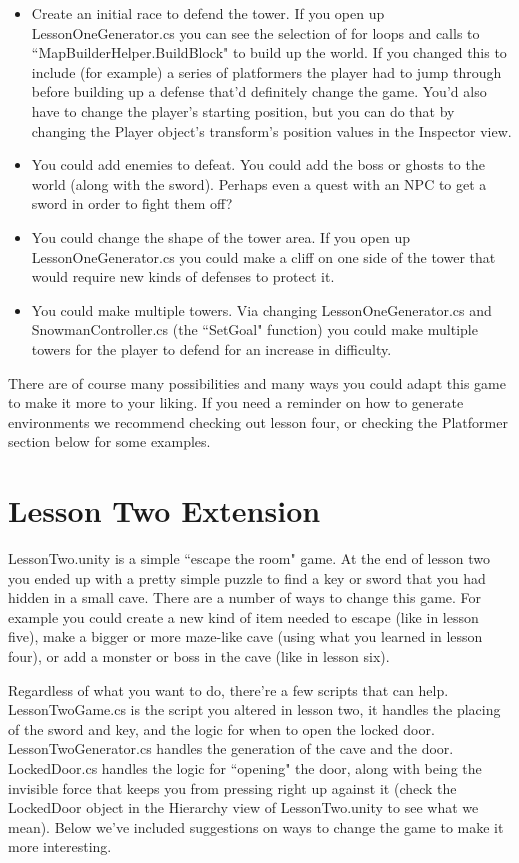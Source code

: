 \documentclass{article}
\begin{document}
\begin{itemize}
  \item Create an initial race to defend the tower. If you open up LessonOneGenerator.cs you can see the selection of for loops and calls to ``MapBuilderHelper.BuildBlock" to build up the world. If you changed this to include (for example) a series of platformers the player had to jump through before building up a defense that'd definitely change the game. You'd also have to change the player's starting position, but you can do that by changing the Player object's transform's position values in the Inspector view. 
  \item You could add enemies to defeat. You could add the boss or ghosts to the world (along with the sword). Perhaps even a quest with an NPC to get a sword in order to fight them off? 
  \item You could change the shape of the tower area. If you open up LessonOneGenerator.cs you could make a cliff on one side of the tower that would require new kinds of defenses to protect it.
  \item You could make multiple towers. Via changing LessonOneGenerator.cs and SnowmanController.cs (the ``SetGoal" function) you could make multiple towers for the player to defend for an increase in difficulty.
\end{itemize}

There are of course many possibilities and many ways you could adapt this game to make it more to your liking. If you need a reminder on how to generate environments we recommend checking out lesson four, or checking the Platformer section below for some examples.

\section{Lesson Two Extension}

LessonTwo.unity is a simple ``escape the room" game. At the end of lesson two you ended up with a pretty simple puzzle to find a key or sword that you had hidden in a small cave. There are a number of ways to change this game. For example you could create a new kind of item needed to escape (like in lesson five), make a bigger or more maze-like cave (using what you learned in lesson four), or add a monster or boss in the cave (like in lesson six). 

Regardless of what you want to do, there're a few scripts that can help. LessonTwoGame.cs is the script you altered in lesson two, it handles the placing of the sword and key, and the logic for when to open the locked door. LessonTwoGenerator.cs handles the generation of the cave and the door. LockedDoor.cs handles the logic for ``opening" the door, along with being the invisible force that keeps you from pressing right up against it (check the LockedDoor object in the Hierarchy view of LessonTwo.unity to see what we mean). Below we've included suggestions on ways to change the game to make it more interesting.
\end{document}
